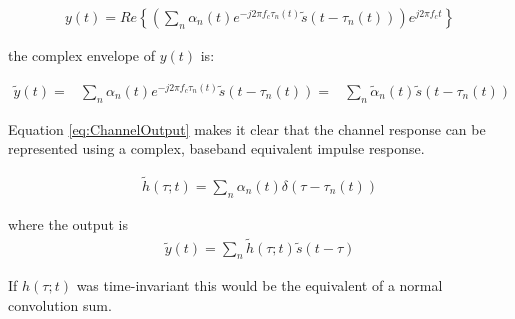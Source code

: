 \begin{align}
	y(t) = Re\left\{\left( \sum_{n} %
	\alpha_{n}(t) e^{-j2 \pi f_{c} \tau_{n}(t)} %
	\tilde{s}(t - \tau_{n}(t)) \right)%
	e^{j 2\pi f_{c} t} \right\}
\end{align}

the complex envelope of $y(t)$ is:

\begin{align}
	\tilde{y}(t) =& \sum_{n}\alpha_{n}(t)%
	e^{-j 2\pi f_{c} \tau_{n}(t)} %
	\tilde{s}(t - \tau_{n}(t))
		     =& \sum_{n}%
	\tilde{\alpha}_{n}(t)\tilde{s}(%
	t-\tau_{n}(t))
	\label{eq:ChannelOutput}
\end{align}

Equation \ref{eq:ChannelOutput} makes it clear that %
the channel response can be represented using a %
complex, baseband equivalent impulse response.

\begin{align}
	\tilde{h}(\tau;t) = \sum_{n} %
	\alpha_{n}(t)\delta(\tau - %
	\tau_{n}(t))
\end{align}

where the output is
\begin{align}
	\tilde{y}(t) = \sum_{n} \tilde{h}%
	(\tau;t)\tilde{s}(t - \tau)
	\label{eq:BasebandChannelFIR}
\end{align}

If $h(\tau;t)$ was time-invariant this would be the %
equivalent of a normal convolution sum.




